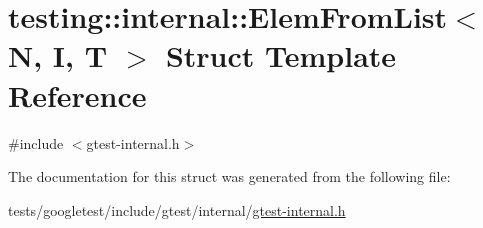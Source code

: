 \hypertarget{structtesting_1_1internal_1_1ElemFromList}{}\section{testing\+:\+:internal\+:\+:Elem\+From\+List$<$ N, I, T $>$ Struct Template Reference}
\label{structtesting_1_1internal_1_1ElemFromList}


{\ttfamily \#include $<$gtest-\/internal.\+h$>$}



The documentation for this struct was generated from the following file\+:\begin{DoxyCompactItemize}
\item 
tests/googletest/include/gtest/internal/\hyperlink{gtest-internal_8h}{gtest-\/internal.\+h}\end{DoxyCompactItemize}
